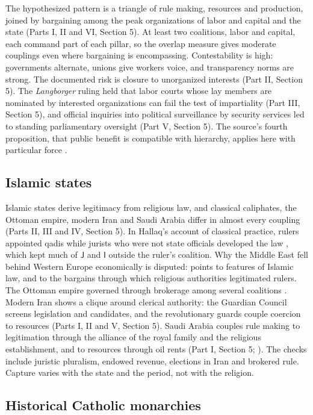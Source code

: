 \documentclass[11pt,letterpaper]{article}
\theoremstyle{definition}
\theoremstyle{remark}
\newcommand{\pJ}{\mathsf{J}}
\newcommand{\pI}{\mathsf{I}}
\begin{document}
The hypothesized pattern is a triangle of rule making, resources and production, joined by bargaining among the peak organizations of labor and capital and the state (Parts I, II and VI, Section 5). At least two coalitions, labor and capital, each command part of each pillar, so the overlap measure gives moderate couplings even where bargaining is encompassing. Contestability is high: governments alternate, unions give workers voice, and transparency norms are strong. The documented risk is closure to unorganized interests (Part II, Section 5). The \emph{Langborger} ruling held that labor courts whose lay members are nominated by interested organizations can fail the test of impartiality (Part III, Section 5), and official inquiries into political surveillance by security services led to standing parliamentary oversight (Part V, Section 5). The source's fourth proposition, that public benefit is compatible with hierarchy, applies here with particular force \citep{largo2026hbs}.

\subsection{Islamic states}

Islamic states derive legitimacy from religious law, and classical caliphates, the Ottoman empire, modern Iran and Saudi Arabia differ in almost every coupling (Parts II, III and IV, Section 5). In Hallaq's account of classical practice, rulers appointed qadis while jurists who were not state officials developed the law \citep{hallaq2009}, which kept much of $\pJ$ and $\pI$ outside the ruler's coalition. Why the Middle East fell behind Western Europe economically is disputed: \citet{kuran2011} points to features of Islamic law, and \citet{rubin2017} to the bargains through which religious authorities legitimated rulers. The Ottoman empire governed through brokerage among several coalitions \citep{barkey2008}. Modern Iran shows a clique around clerical authority: the Guardian Council screens legislation and candidates, and the revolutionary guards couple coercion to resources (Parts I, II and V, Section 5). Saudi Arabia couples rule making to legitimation through the alliance of the royal family and the religious establishment, and to resources through oil rents (Part I, Section 5; \citealt{ross2012}). The checks include juristic pluralism, endowed revenue, elections in Iran and brokered rule. Capture varies with the state and the period, not with the religion.

\subsection{Historical Catholic monarchies}
\end{document}
